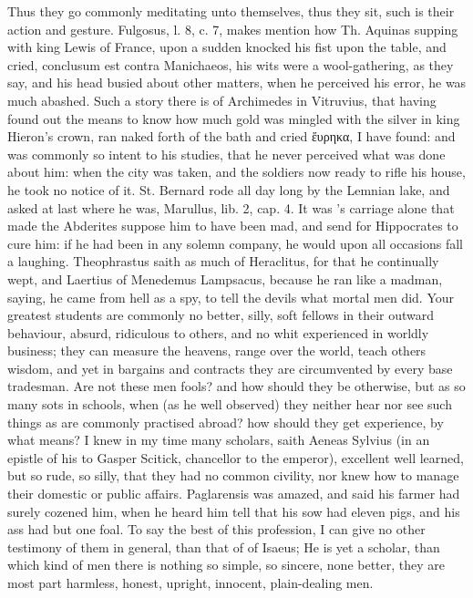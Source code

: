 {Thus they go commonly meditating unto themselves, thus they sit, such
is their action and gesture. Fulgosus, l. 8, c. 7, makes mention how
Th. Aquinas supping with king Lewis of France, upon a sudden knocked
his fist upon the table, and cried, conclusum est contra Manichaeos,
his wits were a wool-gathering, as they say, and his head busied about
other matters, when he perceived his error, he was much abashed.
Such a story there is of Archimedes in Vitruvius, that having found out
the means to know how much gold was mingled with the silver in king
Hieron's crown, ran naked forth of the bath and cried ἕυρηκα, I have
found: and was commonly so intent to his studies, that he never
perceived what was done about him: when the city was taken, and the
soldiers now ready to rifle his house, he took no notice of it. St.
Bernard rode all day long by the Lemnian lake, and asked at last where
he was, Marullus, lib. 2, cap. 4. It was \Democritus{}'s carriage alone
that made the Abderites suppose him to have been mad, and send for
Hippocrates to cure him: if he had been in any solemn company, he would
upon all occasions fall a laughing. Theophrastus saith as much of
Heraclitus, for that he continually wept, and Laertius of Menedemus
Lampsacus, because he ran like a madman, saying, he came from
hell as a spy, to tell the devils what mortal men did. Your greatest
students are commonly no better, silly, soft fellows in their outward
behaviour, absurd, ridiculous to others, and no whit experienced in
worldly business; they can measure the heavens, range over the world,
teach others wisdom, and yet in bargains and contracts they are
circumvented by every base tradesman. Are not these men fools? and how
should they be otherwise, but as so many sots in schools, when (as
he well observed) they neither hear nor see such things as are
commonly practised abroad? how should they get experience, by what
means? I knew in my time many scholars, saith Aeneas Sylvius (in
an epistle of his to Gasper Scitick, chancellor to the emperor),
excellent well learned, but so rude, so silly, that they had no common
civility, nor knew how to manage their domestic or public affairs.
Paglarensis was amazed, and said his farmer had surely cozened him,
when he heard him tell that his sow had eleven pigs, and his ass had
but one foal. To say the best of this profession, I can give no other
testimony of them in general, than that of \Pliny{} of Isaeus; He is
yet a scholar, than which kind of men there is nothing so simple, so
sincere, none better, they are most part harmless, honest, upright,
innocent, plain-dealing men.

}
